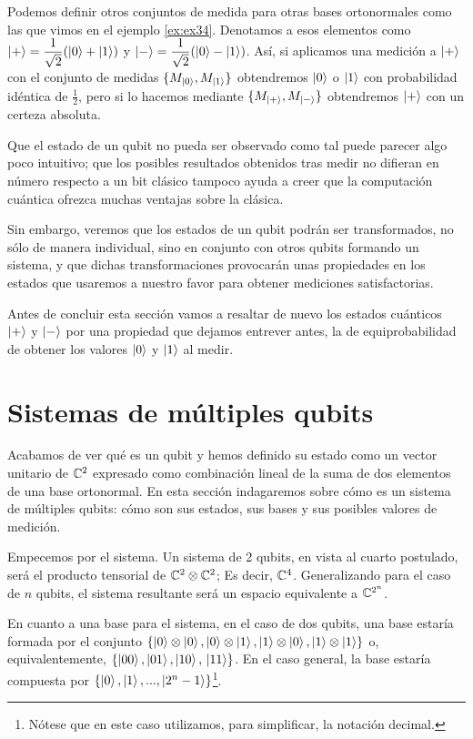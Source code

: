 Podemos definir otros conjuntos de medida para otras bases ortonormales como las que vimos en el ejemplo \ref{ex:ex34}. Denotamos a esos elementos como $\left|+\right\rangle=\dfrac{1}{\sqrt{2}}(\left|0\right\rangle + \left|1\right\rangle)$ y $\left|-\right\rangle=\dfrac{1}{\sqrt{2}}(\left|0\right\rangle - \left|1\right\rangle)$. Así, si aplicamos una medición a $\left|+\right\rangle$ con el conjunto de medidas $\{M_{\left|0\right\rangle},M_{\left|1\right\rangle}\}$ obtendremos $\left|0\right\rangle$ o $\left|1\right\rangle$ con probabilidad idéntica de $\frac{1}{2}$, pero si lo hacemos mediante $\{M_{\left|+\right\rangle},M_{\left|-\right\rangle}\}$ obtendremos $\left|+\right\rangle$ con un certeza absoluta.

Que el estado de un qubit no pueda ser observado como tal puede parecer algo poco intuitivo; que los posibles resultados obtenidos tras medir no difieran en número respecto a un bit clásico tampoco ayuda a creer que la computación cuántica ofrezca muchas ventajas sobre la clásica.

Sin embargo, veremos que los estados de un qubit podrán ser transformados, no sólo de manera individual, sino en conjunto con otros qubits formando un sistema, y que dichas transformaciones provocarán unas propiedades en los estados que usaremos a nuestro favor para obtener mediciones satisfactorias.

Antes de concluir esta sección vamos a resaltar de nuevo los estados cuánticos $\left|+\right\rangle$ y $\left|-\right\rangle$ por una propiedad que dejamos entrever antes, la de equiprobabilidad de obtener los valores $\left|0\right\rangle$ y $\left|1\right\rangle$ al medir.


\section{Sistemas de múltiples qubits}

Acabamos de ver qué es un qubit y hemos definido su estado como un vector unitario de $\mathbb{C}^2$ expresado como combinación lineal de la suma de dos elementos de una base ortonormal. En esta sección indagaremos sobre cómo es un sistema de múltiples qubits: cómo son sus estados, sus bases y sus posibles valores de medición.

Empecemos por el sistema. Un sistema de 2 qubits, en vista al cuarto postulado, será el producto tensorial de $\mathbb{C}^2\otimes\mathbb{C}^2$; Es decir, $\mathbb{C}^4$. Generalizando para el caso de $n$ qubits, el sistema resultante será un espacio equivalente a $\mathbb{C}^{2^n}$.

En cuanto a una base para el sistema, en el caso de dos qubits, una base estaría formada por el conjunto $\{\left|0\right\rangle\otimes\left|0\right\rangle,\left|0\right\rangle\otimes\left|1\right\rangle,\left|1\right\rangle\otimes\left|0\right\rangle,\left|1\right\rangle\otimes\left|1\right\rangle\}$ o, equivalentemente, $\{\left|00\right\rangle,\left|01\right\rangle,\left|10\right\rangle,\\ \left|11\right\rangle\}$. En el caso general, la base estaría compuesta por $\{\left|0\right\rangle,\left|1\right\rangle,...,\left|2^n-1\right\rangle\}$\footnote{Nótese que en este caso utilizamos, para simplificar, la notación decimal.}.

